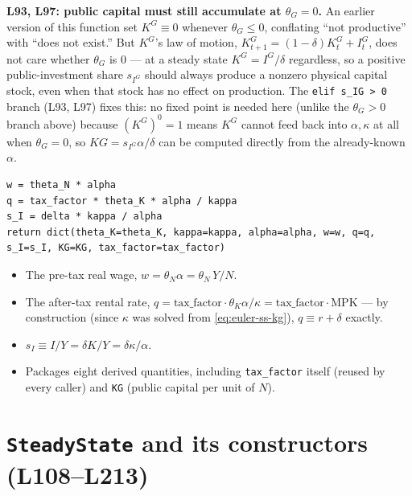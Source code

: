 \documentclass[11pt]{article}
\begin{document}
\begin{notebox}
\textbf{L93, L97: public capital must still accumulate at $\theta_G=0$.} An
earlier version of this function set $K^G\equiv0$ whenever $\theta_G\le0$,
conflating ``not productive'' with ``does not exist.'' But $K^G$'s law of
motion, $K^G_{t+1}=(1-\delta)K^G_t+I^G_t$, does not care whether $\theta_G$
is $0$ --- at a steady state $K^G=I^G/\delta$ regardless, so a positive
public-investment share $s_{I^G}$ should always produce a nonzero physical
capital stock, even when that stock has no effect on production. The
\texttt{elif s\_IG > 0} branch (L93, L97) fixes this: no fixed point is
needed here (unlike the $\theta_G>0$ branch above) because $(K^G)^0=1$
means $K^G$ cannot feed back into $\alpha,\kappa$ at all when $\theta_G=0$,
so $KG=s_{I^G}\alpha/\delta$ can be computed directly from the
already-known $\alpha$.
\end{notebox}

\begin{lstlisting}[firstnumber=98]
w = theta_N * alpha
q = tax_factor * theta_K * alpha / kappa
s_I = delta * kappa / alpha
return dict(theta_K=theta_K, kappa=kappa, alpha=alpha, w=w, q=q, s_I=s_I, KG=KG, tax_factor=tax_factor)
\end{lstlisting}
\begin{itemize}
\item[\textbf{L98}] The pre-tax real wage, $w=\theta_N\alpha=\theta_N\,Y/N$.
\item[\textbf{L99}] The after-tax rental rate,
$q=\text{tax\_factor}\cdot\theta_K\alpha/\kappa=\text{tax\_factor}\cdot\text{MPK}$
--- by construction (since $\kappa$ was solved from
\eqref{eq:euler-ss-kg}), $q\equiv r+\delta$ exactly.
\item[\textbf{L100}] $s_I\equiv I/Y=\delta K/Y=\delta\kappa/\alpha$.
\item[\textbf{L101}] Packages eight derived quantities, including
\texttt{tax\_factor} itself (reused by every caller) and \texttt{KG}
(public capital per unit of $N$).
\end{itemize}

\section{\texttt{SteadyState} and its constructors (L108--L213)}
\label{sec:ss}
\end{document}
